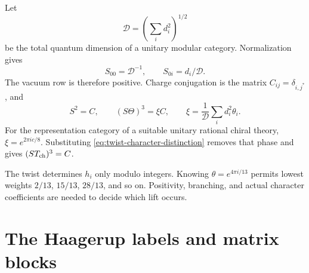 Let
\[
 \mathcal D=\left(\sum_i d_i^2\right)^{1/2}
\]
be the total quantum dimension of a unitary modular category.
Normalization gives
\begin{equation}
 S_{00}=\mathcal D^{-1},\qquad S_{0i}=d_i/\mathcal D.
 \label{eq:S-vacuum-row}
\end{equation}
The vacuum row is therefore positive.  Charge conjugation is the
matrix $C_{ij}=\delta_{i,j^*}$, and
\begin{equation}
 S^2=C,\qquad
 (S\Theta)^3=\xi C,
 \qquad
 \xi=\frac1{\mathcal D}\sum_i d_i^2\theta_i.
 \label{eq:modular-relations-phase}
\end{equation}
For the representation category of a suitable unitary rational
chiral theory, $\xi=e^{2\pi i c/8}$.  Substituting
\eqref{eq:twist-character-distinction} removes that phase and gives
$(ST_{\rm ch})^3=C$.

The twist determines $h_i$ only modulo integers.  Knowing
$\theta=e^{4\pi i/13}$ permits lowest weights $2/13$, $15/13$,
$28/13$, and so on.  Positivity, branching, and actual character
coefficients are needed to decide which lift occurs.

\section{The Haagerup labels and matrix blocks}

